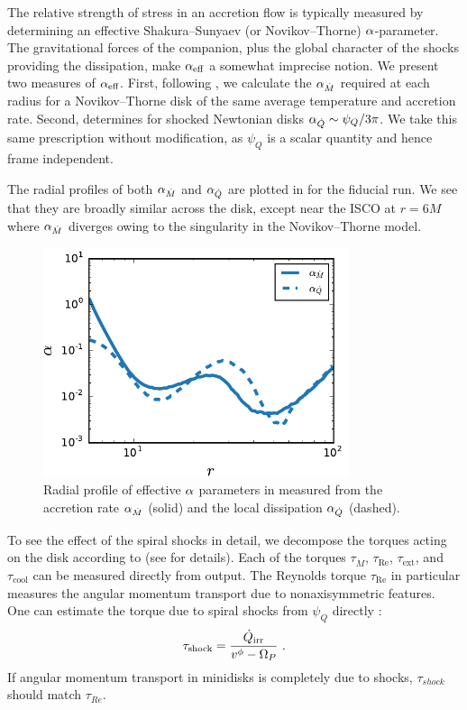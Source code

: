 The relative strength of stress in an accretion flow is typically measured by determining an effective Shakura--Sunyaev (or Novikov--Thorne) $\alpha$-parameter.  The gravitational forces of the companion, plus the global character of the shocks providing the dissipation, make $\alpha_{\text{eff}}$ a somewhat imprecise notion.  We present two measures of $\alpha_{\text{eff}}$.  First, following \cite{Ju16}, we calculate the $\alpha_{\dot{M}}$ required at each radius for a Novikov--Thorne disk of the same average temperature and accretion rate.  Second, \cite{Rafikov16} determines for shocked Newtonian disks $\alpha_{\dot{Q}} \sim \psi_Q / 3\pi$.  We take this same prescription without modification, as $\psi_Q$ is a scalar quantity and hence frame independent.  

The radial profiles of both $\alpha_{\dot{M}}$ and $\alpha_{\dot{Q}}$ are plotted in  for the fiducial run.  We see that they are broadly similar across the disk, except near the ISCO at $r=6M$ where $\alpha_{\dot{M}}$ diverges owing to the singularity in the Novikov--Thorne model.

\begin{figure}
\begin{center}
\includegraphics[width=0.8\textwidth]{figures/minidisk/q011_m3_alpha_r.pdf}
\end{center}
\caption{ Radial profile of effective $\alpha$ parameters in  measured from the accretion rate $\alpha_{\dot{M}}$ (solid) and the local dissipation $\alpha_{\dot{Q}}$ (dashed).}
\end{figure}

To see the effect of the spiral shocks in detail, we decompose the torques acting on the disk according to  (see  for details). Each of the torques $\tau_{\dot{M}}$, $\tau_\text{Re}$, $\tau_\text{ext}$, and $\tau_\text{cool}$ can be measured directly from \Disco{} output.  The Reynolds torque $\tau_\text{Re}$ in particular measures the angular momentum transport due to nonaxisymmetric features.  One can estimate the torque due to spiral shocks from $\psi_Q$ directly \citep{Rafikov16}:
\begin{equation}
	\tau_\text{shock} = \frac{\dot{Q}_\text{irr}}{v^\phi - \Om_P} \ . \eqlabel{tauRaf}
\end{equation}
If angular momentum transport in minidisks is completely due to shocks, $\tau_{shock}$ should match $\tau_{Re}$.

